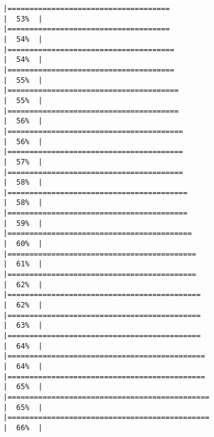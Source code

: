 \documentclass[
]{article}
\begin{document}
\begin{verbatim}
|=====================================                                 |  53%  |                                                                              |=====================================                                 |  54%  |                                                                              |======================================                                |  54%  |                                                                              |======================================                                |  55%  |                                                                              |=======================================                               |  55%  |                                                                              |=======================================                               |  56%  |                                                                              |========================================                              |  56%  |                                                                              |========================================                              |  57%  |                                                                              |========================================                              |  58%  |                                                                              |=========================================                             |  58%  |                                                                              |=========================================                             |  59%  |                                                                              |==========================================                            |  60%  |                                                                              |===========================================                           |  61%  |                                                                              |===========================================                           |  62%  |                                                                              |============================================                          |  62%  |                                                                              |============================================                          |  63%  |                                                                              |============================================                          |  64%  |                                                                              |=============================================                         |  64%  |                                                                              |=============================================                         |  65%  |                                                                              |==============================================                        |  65%  |                                                                              |==============================================                        |  66%  |                                                                              
\end{verbatim}
\end{document}
